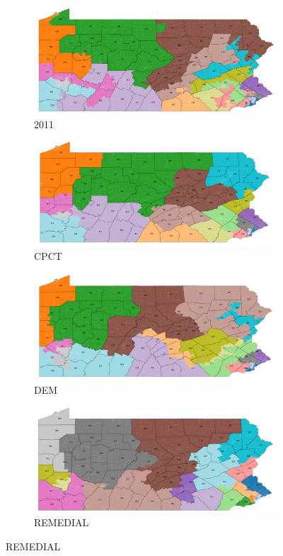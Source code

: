 \documentclass{mgggarticle}
\begin{document}
\begin{figure}[h]
\begin{subfigure}{0.475\textwidth}
\centering
\includegraphics[width=\textwidth]{figs/2011_counties.png}
\caption{2011}
\end{subfigure}
\begin{subfigure}{0.475\textwidth}
\centering
\includegraphics[width=\textwidth]{figs/CPCT_counties.png}
\caption{CPCT}
\end{subfigure}

\begin{subfigure}{0.475\textwidth}
\includegraphics[width=\textwidth]{figs/DEM_counties.png}
\caption{DEM}
\end{subfigure}
\begin{subfigure}{0.475\textwidth}
\includegraphics[width=\textwidth]{figs/REMEDIAL_counties.png}
\caption{REMEDIAL}
\end{subfigure}


\end{figure}
\end{document}
